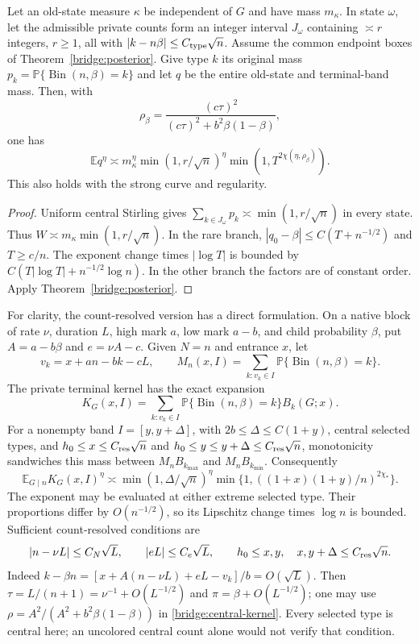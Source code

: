 \begin{corollary}\label{bridge:terminal-band}
Let an old-state measure $\kappa$ be independent of $G$ and have mass
$m_\kappa$. In state $\omega$, let the admissible private counts form
an integer interval $J_\omega$ containing $\asymp r$ integers,
$r\ge1$, all with $|k-n\beta|\le C_{\rm type}\sqrt n$.
Assume the common endpoint boxes of Theorem~\ref{bridge:posterior}.
Give type $k$ its original mass
$p_k=\mathbb P\{\operatorname{Bin}(n,\beta)=k\}$ and let $q$ be
the entire old-state and terminal-band mass. Then, with
\[
 \rho_\beta=\frac{(c\tau)^2}
 {(c\tau)^2+b^2\beta(1-\beta)},
\]
one has
\[
 \mathbb E q^\eta\asymp m_\kappa^\eta
       \min(1,r/\sqrt n)^\eta
       \min(1,T^{2\chi(\eta,\rho_\beta)}).
\]
This also holds with the strong curve and regularity.
\end{corollary}
\begin{proof}
Uniform central Stirling gives
$\sum_{k\in J_\omega}p_k\asymp\min(1,r/\sqrt n)$ in every state.
Thus $W\asymp m_\kappa\min(1,r/\sqrt n)$. In the rare branch,
$|q_0-\beta|\le C(T+n^{-1/2})$ and $T\ge c/n$.
The exponent change times $|\log T|$ is bounded by
$C(T|\log T|+n^{-1/2}\log n)$. In the other branch the factors
are of constant order. Apply Theorem~\ref{bridge:posterior}.
\end{proof}

For clarity, the count-resolved version has a direct formulation.
On a native block of rate $\nu$, duration $L$, high mark $a$, low
mark $a-b$, and child probability $\beta$, put
$A=a-b\beta$ and $e=\nu A-c$. Given $N=n$ and entrance $x$, let
\[
 v_k=x+an-bk-cL,\qquad
 M_n(x,I)=\sum_{k:v_k\in I}\mathbb P\{\operatorname{Bin}(n,\beta)=k\}.
\]
The private terminal kernel has the exact expansion
\begin{equation}
 K_G(x,I)=\sum_{k:v_k\in I}
          \mathbb P\{\operatorname{Bin}(n,\beta)=k\}B_k(G;x).
 \label{bridge:terminal-expansion}
\end{equation}
For a nonempty band $I=[y,y+\Delta]$, with
$2b\le\Delta\le C(1+y)$, central selected types, and
$h_0\le x\le C_{\rm res}\sqrt n$ and
$h_0\le y\le y+\Delta\le C_{\rm res}\sqrt n$, monotonicity sandwiches this mass between
$M_nB_{k_{\max}}$ and $M_nB_{k_{\min}}$. Consequently
\begin{equation}
 \mathbb E_{G\mid n}K_G(x,I)^\eta
 \asymp \min(1,\Delta/\sqrt n)^\eta
       \min\{1,((1+x)(1+y)/n)^{2\chi_*}\}.
 \label{bridge:central-kernel}
\end{equation}
The exponent may be evaluated at either extreme selected type. Their
proportions differ by $O(n^{-1/2})$, so its Lipschitz change times
$\log n$ is bounded. Sufficient count-resolved conditions are
\[
 |n-\nu L|\le C_N\sqrt L,\qquad |eL|\le C_e\sqrt L,
 \qquad h_0\le x,y,\quad x,y+\Delta\le C_{\rm res}\sqrt n.
\]
Indeed
$k-\beta n=[x+A(n-\nu L)+eL-v_k]/b=O(\sqrt L)$.
Then $\tau=L/(n+1)=\nu^{-1}+O(L^{-1/2})$ and
$\pi=\beta+O(L^{-1/2})$; one may use
$\rho=A^2/(A^2+b^2\beta(1-\beta))$ in \eqref{bridge:central-kernel}.
Every selected type is central here; an uncolored central count alone
would not verify that condition.

